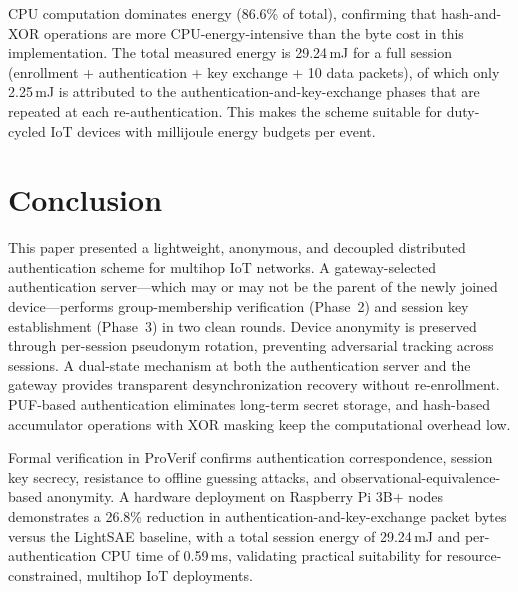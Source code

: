 \documentclass[conference]{IEEEtran}
\begin{document}
CPU computation dominates energy (86.6\% of total), confirming that
hash-and-XOR operations are more CPU-energy-intensive than the byte cost
in this implementation.  The total measured energy is 29.24\,mJ for a full
session (enrollment + authentication + key exchange + 10 data packets),
of which only 2.25\,mJ is attributed to the authentication-and-key-exchange
phases that are repeated at each re-authentication.  This makes the scheme
suitable for duty-cycled IoT devices with millijoule energy budgets per
event.

\section{Conclusion}

This paper presented a lightweight, anonymous, and decoupled distributed
authentication scheme for multihop IoT networks.  A gateway-selected
authentication server—which may or may not be the parent of the newly joined
device—performs group-membership verification (Phase~2) and session key
establishment (Phase~3) in two clean rounds.  Device anonymity is preserved
through per-session pseudonym rotation, preventing adversarial tracking across
sessions.  A dual-state mechanism at both the authentication server and the
gateway provides transparent desynchronization recovery without re-enrollment.
PUF-based authentication eliminates long-term secret storage, and
hash-based accumulator operations with XOR masking keep the computational
overhead low.

Formal verification in ProVerif confirms authentication correspondence,
session key secrecy, resistance to offline guessing attacks, and
observational-equivalence-based anonymity.  A hardware deployment on
Raspberry Pi 3B+ nodes demonstrates a 26.8\% reduction in
authentication-and-key-exchange packet bytes versus the LightSAE baseline,
with a total session energy of 29.24\,mJ and per-authentication CPU time
of 0.59\,ms, validating practical suitability for resource-constrained,
multihop IoT deployments.
\end{document}
